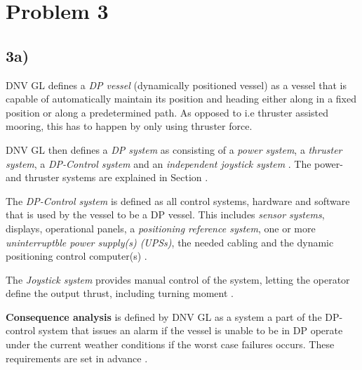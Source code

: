 \section*{Problem 3}


\subsection*{3a)}
 \label{par:Def_DP_system}

DNV GL defines a \textit{DP vessel} (dynamically positioned vessel) as a vessel that is capable of automatically maintain its position and heading either along in a fixed position or along a predetermined path. As opposed to i.e thruster assisted mooring, this has to happen by only using thruster force\cite{RulesShipsDNVGLPart6Chap3}. 

DNV GL then defines a \textit{DP system} as consisting of a \textit{power system}, a \textit{thruster system}, a \textit{DP-Control system} and an \textit{independent joystick system} \cite{RulesShipsDNVGLPart6Chap3}. The power- and thruster systems are explained in Section . 

The \textit{DP-Control system} is defined as all control systems, hardware and software that is used by the vessel to be a DP vessel. This includes \textit{sensor systems}, displays, operational panels, a \textit{positioning reference system}, one or more \textit{uninterruptble power supply(s) (UPSs)}, the needed cabling and the dynamic positioning control computer(s) \cite{RulesShipsDNVGLPart6Chap3}.  

The \textit{Joystick system} provides manual control of the system, letting the operator define the output thrust, including turning moment \cite{RulesShipsDNVGLPart6Chap3}.  

\textbf{Consequence analysis} is defined by DNV GL as a system a part of the DP-control system that issues an alarm if the vessel is unable to be in DP operate under the current weather conditions if the worst case failures occurs. These requirements are set in advance \cite{RulesShipsDNVGLPart6Chap3}. 


